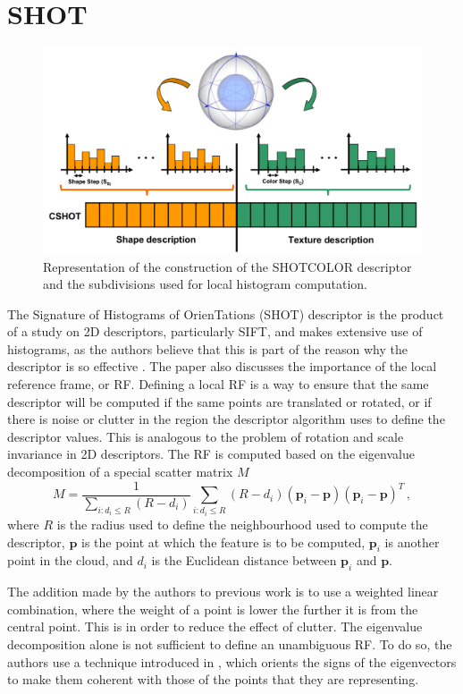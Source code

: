 \documentclass[11pt,a4paper]{kth-mag}
\begin{document}
\section{SHOT}
\begin{figure}
  \centering
  \includegraphics[width=\textwidth]{images/shotcolor}
  \caption{Representation of the construction of the SHOTCOLOR descriptor and
    the subdivisions used for local histogram computation.}
  \label{fig:shotcolor}
\end{figure}
The Signature of Histograms of OrienTations (SHOT) descriptor is the product of
a study on 2D descriptors, particularly SIFT, and makes extensive use of
histograms, as the authors believe that this is part of the reason why the
descriptor is so effective \cite{tombari2010unique}. The paper also discusses
the importance of the local reference frame, or RF. Defining a local RF is a way
to ensure that the same descriptor will be computed if the same points are
translated or rotated, or if there is noise or clutter in the region the
descriptor algorithm uses to define the descriptor values. This is analogous to
the problem of rotation and scale invariance in 2D descriptors. The RF is
computed based on the eigenvalue decomposition of a special scatter matrix $M$
\begin{equation}
  \label{eq:12}
  M=\frac{1}{\sum_{i:d_i\leq R}(R-d_i)}\sum_{i:d_i\leq R}(R-d_i)(\mathbf{p}_i-\mathbf{p})(\mathbf{p}_i-\mathbf{p})^T\,,
\end{equation}
where $R$ is the radius used to define the neighbourhood used to compute the
descriptor, $\mathbf{p}$ is the point at which the feature is to be computed,
$\mathbf{p}_i$ is another point in the cloud, and $d_i$ is the Euclidean
distance between $\mathbf{p}_i$ and $\mathbf{p}$.

The addition made by the authors to previous work is to use a weighted linear
combination, where the weight of a point is lower the further it is from the
central point. This is in order to reduce the effect of clutter. The eigenvalue
decomposition alone is not sufficient to define an unambiguous RF. To do so, the
authors use a technique introduced in \cite{bro2008resolving}, which orients the
signs of the eigenvectors to make them coherent with those of the points that
they are representing.
\end{document}
